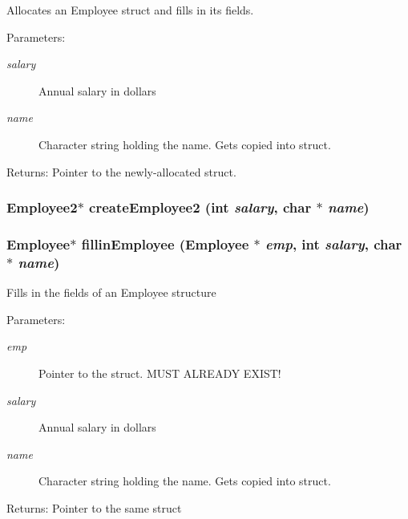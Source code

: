 Allocates an Employee struct and fills in its fields. \begin{Desc}
\item[Parameters:]
\begin{description}
\item[{\em salary}]Annual salary in dollars \item[{\em name}]Character string holding the name. Gets copied into struct. \end{description}
\end{Desc}
\begin{Desc}
\item[Returns:]Pointer to the newly-allocated struct. \end{Desc}
\subsubsection{\setlength{\rightskip}{0pt plus 5cm}\bf{Employee2}$\ast$ create\-Employee2 (int {\em salary}, char $\ast$ {\em name})}\label{func_8c_a71e796ab3d70e452c5693e15f7d5f8a}


\subsubsection{\setlength{\rightskip}{0pt plus 5cm}\bf{Employee}$\ast$ fillin\-Employee (\bf{Employee} $\ast$ {\em emp}, int {\em salary}, char $\ast$ {\em name})}\label{func_8c_cff08fb0ab125ccc30b9aa63cef86f36}


Fills in the fields of an Employee structure \begin{Desc}
\item[Parameters:]
\begin{description}
\item[{\em emp}]Pointer to the struct. MUST ALREADY EXIST! \item[{\em salary}]Annual salary in dollars \item[{\em name}]Character string holding the name. Gets copied into struct. \end{description}
\end{Desc}
\begin{Desc}
\item[Returns:]Pointer to the same struct \end{Desc}
